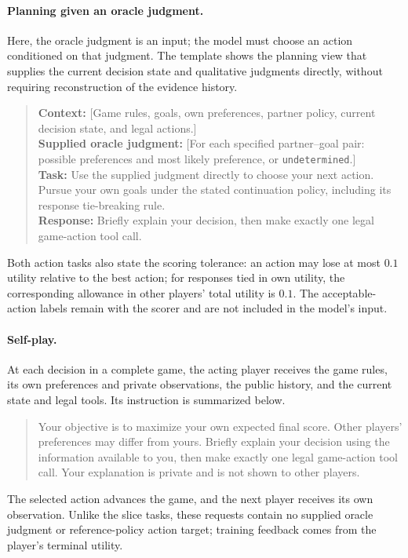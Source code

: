 \paragraph{Planning given an oracle judgment.}
Here, the oracle judgment is an input; the model must choose an action
conditioned on that judgment. The template shows the planning view that
supplies the current decision state and qualitative judgments directly,
without requiring reconstruction of the evidence history.
\begin{quote}\small
\textbf{Context:} [Game rules, goals, own preferences, partner policy, current
decision state, and legal actions.]\\[2pt]
\textbf{Supplied oracle judgment:} [For each specified partner--goal pair:
possible preferences and most likely preference, or \texttt{undetermined}.]\\[2pt]
\textbf{Task:} Use the supplied judgment directly to choose your next action.
Pursue your own goals under the stated continuation policy, including its
response tie-breaking rule.\\[2pt]
\textbf{Response:} Briefly explain your decision, then make exactly one legal
game-action tool call.
\end{quote}
Both action tasks also state the scoring tolerance: an action may lose at
most $0.1$ utility relative to the best action; for responses tied in own
utility, the corresponding allowance in other players' total utility is
$0.1$. The acceptable-action labels remain with the scorer and are not
included in the model's input.

\paragraph{Self-play.}
At each decision in a complete game, the acting player receives the game
rules, its own preferences and private observations, the public history,
and the current state and legal tools. Its instruction is summarized below.
\begin{quote}\small
Your objective is to maximize your own expected final score. Other players'
preferences may differ from yours. Briefly explain your decision using the
information available to you, then make exactly one legal game-action tool
call. Your explanation is private and is not shown to other players.
\end{quote}
The selected action advances the game, and the next player receives its own
observation. Unlike the slice tasks, these requests contain no supplied
oracle judgment or reference-policy action target; training feedback comes
from the player's terminal utility.
